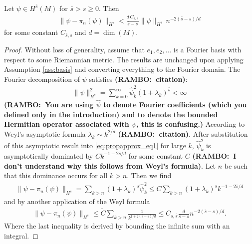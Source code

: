 \documentclass[final,leqno]{siamltex1213}
\newcommand{\ram}[1]{{\normalsize{\textbf{({\color{red}RAMBO:\ }#1)}}}}
\begin{document}
\begin{proposition} \label{prop:approximation}
	Let $\psi \in H^{\bar{s}}(M)$ for $\bar{s} > s \geq 0$.
	Then
	\begin{align}
		\| \psi - \pi_{n}(\psi) \|_{H^{s}} <  \frac{d \, C_{\bar{s},s} }{ \bar{s}-s} \| \psi \|_{H^{\bar{s}}} \, n^{-2(\bar{s}-s)/d}
	\end{align}
	for some constant $C_{\bar{s},s}$ and $d = \dim(M)$.
\end{proposition}
\begin{proof}
	Without loss of generality, assume that $e_{1},e_{2},\dots$ is a Fourier basis with respect to some Riemannian metric.
	The results are unchanged upon applying Assumption \ref{ass:basis} and converting everything to the Fourier domain.
	The Fourier decomposition of $\psi$ satisfies \ram{citation}:
	\begin{align}
		\| \psi \|^{2}_{H^{\bar{s} }} = \sum_{k=0}^{\infty} \hat{\psi}_{k}^{2} (1+\lambda_{k})^{\bar{s}} < \infty
		\label{eq:propapprox_eq1}
	\end{align}
	\ram{You are using $\hat{\psi}$ to denote Fourier coefficients (which you defined only in the introduction) and to denote the bounded Hermitian operator associated with $\psi$, this is confusing.}
	According to Weyl's asymptotic formula $\lambda_{k} \sim k^{2/d}$ \ram{citation}.
	After substitution of this asymptotic result into \eqref{eq:propapprox_eq1} for large $k$, $\hat{\psi}_{k}^{2}$ is asymptotically dominated by  $C k^{-1- 2\bar{s}/d}$ for some constant $C$ \ram{I don't understand why this follows from Weyl's formula}.
	Let $n$ be such that this dominance occurs for all $k>n$.  Then we find
	\begin{align}
		\| \psi - \pi_{n}(\psi) \|_{H^{s}} = \sum_{k>n} (1+\lambda_{k})^{s} \hat{\psi}_{k}^{2} \leq C \sum_{k>n} (1+\lambda_{k})^{s} k^{-1- 2\bar{s}/d}
	\end{align}
	and by another application of the Weyl formula
	\begin{align}
		\| \psi - \pi_{n}(\psi) \|_{H^{s}} \leq \tilde{C} \sum_{k>n} \frac{1}{k^{1+2(\bar{s}-s)/d}} \leq C_{s,\bar{s}}  \frac{d }{ \bar{s}-s} n^{-2(\bar{s}-s)/d}.
	\end{align}
	Where the last inequality is derived by bounding the infinite sum with an integral.
\end{proof}

\end{document}
